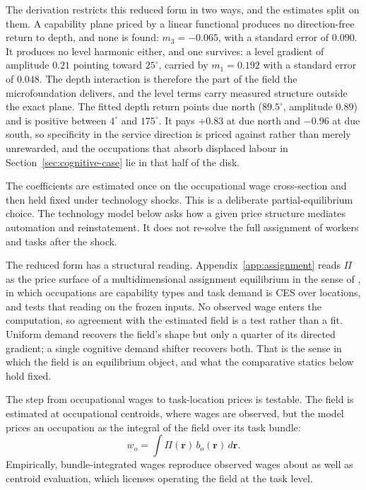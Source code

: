 \documentclass[12pt, a4paper]{article}
\begin{document}
The derivation restricts this reduced form in two ways, and the
estimates split on them. A capability plane priced by a linear
functional produces no direction-free return to depth, and none is
found: $m_3 = -0.065$, with a standard error of $0.090$. It produces no
level harmonic either, and one survives: a level gradient of amplitude
$0.21$ pointing toward $25^\circ$, carried by $m_1 = 0.192$ with a
standard error of $0.048$. The depth interaction is therefore the part
of the field the microfoundation delivers, and the level terms carry
measured structure outside the exact plane. The fitted depth return
points due north ($89.5^\circ$, amplitude $0.89$) and is positive
between $4^\circ$ and $175^\circ$. It pays $+0.83$ at due north and
$-0.96$ at due south, so specificity in the service direction is priced
against rather than merely unrewarded, and the occupations that absorb
displaced labour in Section~\ref{sec:cognitive-case} lie in that half
of the disk.

The coefficients are estimated once on the occupational wage
cross-section and then held fixed under technology shocks. This is a
deliberate partial-equilibrium choice. The technology model below asks
how a given price structure mediates automation and reinstatement. It
does not re-solve the full assignment of workers and tasks after the
shock.

The reduced form has a structural reading.
Appendix~\ref{app:assignment} reads $\Pi$ as the price surface of a
multidimensional assignment equilibrium in the sense of
\textcite{lindenlaub2017}, in which occupations are capability types
and task demand is CES over locations, and tests that reading on the
frozen inputs. No observed wage enters the computation, so agreement
with the estimated field is a test rather than a fit. Uniform demand
recovers the field's shape but only a quarter of its directed gradient;
a single cognitive demand shifter recovers both. That is the sense in
which the field is an equilibrium object, and what the comparative
statics below hold fixed.

The step from occupational wages to task-location prices is testable.
The field is estimated at occupational centroids, where wages are
observed, but the model prices an occupation as the integral of the
field over its task bundle:
\begin{equation}
  w_o
  =
  \int \Pi(\mathbf{r})\,b_o(\mathbf{r})\,d\mathbf{r}.
  \label{eq:wage-bundle}
\end{equation}
Empirically, bundle-integrated wages reproduce observed wages about as
well as centroid evaluation, which licenses operating the field at the
task level.
\end{document}
